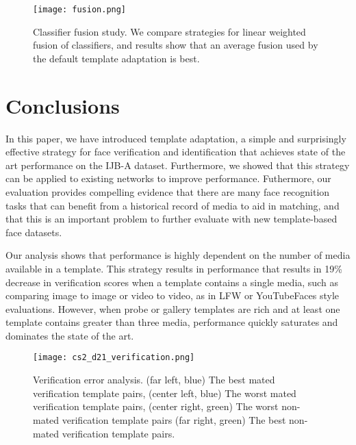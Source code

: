 \documentclass[10pt,twocolumn,letterpaper]{article}
\theoremstyle{definition}		\newtheorem{defn}[thm]{Definition}
\newcommand{\figwidth}{6.85in}
\begin{document}
 \fi
\ifdefined\ECCV
\begin{figure*}[!t]
\begin{centering}
\texttt{[image: fusion.png]} 
\caption{Classifier fusion study.  We compare strategies for linear weighted fusion of classifiers, and results show that an average fusion used by the default template adaptation is best.}  
\label{f:fusion}
\end{centering}
\end{figure*}

 \fi













\section{Conclusions}

In this paper, we have introduced template adaptation, a simple and surprisingly effective strategy for face verification and identification that achieves state of the art performance on the IJB-A dataset.  Furthermore, we showed that this strategy can be applied to existing networks to improve performance.  Futhermore, our evaluation provides compelling evidence that there are many face recognition tasks that can benefit from a historical record of media to aid in matching, and that this is an important problem to further evaluate with new template-based face datasets.  



Our analysis shows that performance is highly dependent on the number of media available in a template.  This strategy results in performance that results in 19\% decrease in verification scores when a template contains a single media, such as comparing image to image or video to video, as in LFW or YouTubeFaces style evaluations.  However, when probe or gallery templates are rich and at least one template contains greater than three media, performance quickly saturates and dominates the state of the art.  


\ifdefined\ECCV
\begin{figure*}[t]
\begin{centering}
\texttt{[image: cs2\_d21\_verification.png]} 
\caption{Verification error analysis.  (far left, blue) The best mated verification template pairs, (center left, blue) The worst mated verification template pairs, (center right, green) The worst non-mated verification template pairs (far right, green) The best non-mated verification template pairs.  
}
\label{f:verification_errors}
\end{centering}
\end{figure*}
\end{document}
